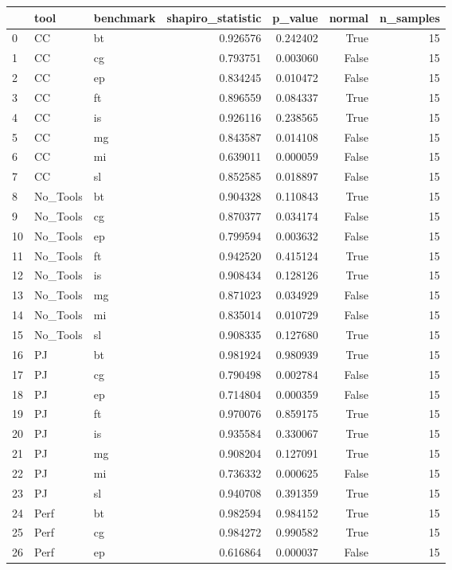 \begin{tabular}{lllrrrr}
\toprule
 & tool & benchmark & shapiro_statistic & p_value & normal & n_samples \\
\midrule
0 & CC & bt & 0.926576 & 0.242402 & True & 15 \\
1 & CC & cg & 0.793751 & 0.003060 & False & 15 \\
2 & CC & ep & 0.834245 & 0.010472 & False & 15 \\
3 & CC & ft & 0.896559 & 0.084337 & True & 15 \\
4 & CC & is & 0.926116 & 0.238565 & True & 15 \\
5 & CC & mg & 0.843587 & 0.014108 & False & 15 \\
6 & CC & mi & 0.639011 & 0.000059 & False & 15 \\
7 & CC & sl & 0.852585 & 0.018897 & False & 15 \\
8 & No_Tools & bt & 0.904328 & 0.110843 & True & 15 \\
9 & No_Tools & cg & 0.870377 & 0.034174 & False & 15 \\
10 & No_Tools & ep & 0.799594 & 0.003632 & False & 15 \\
11 & No_Tools & ft & 0.942520 & 0.415124 & True & 15 \\
12 & No_Tools & is & 0.908434 & 0.128126 & True & 15 \\
13 & No_Tools & mg & 0.871023 & 0.034929 & False & 15 \\
14 & No_Tools & mi & 0.835014 & 0.010729 & False & 15 \\
15 & No_Tools & sl & 0.908335 & 0.127680 & True & 15 \\
16 & PJ & bt & 0.981924 & 0.980939 & True & 15 \\
17 & PJ & cg & 0.790498 & 0.002784 & False & 15 \\
18 & PJ & ep & 0.714804 & 0.000359 & False & 15 \\
19 & PJ & ft & 0.970076 & 0.859175 & True & 15 \\
20 & PJ & is & 0.935584 & 0.330067 & True & 15 \\
21 & PJ & mg & 0.908204 & 0.127091 & True & 15 \\
22 & PJ & mi & 0.736332 & 0.000625 & False & 15 \\
23 & PJ & sl & 0.940708 & 0.391359 & True & 15 \\
24 & Perf & bt & 0.982594 & 0.984152 & True & 15 \\
25 & Perf & cg & 0.984272 & 0.990582 & True & 15 \\
26 & Perf & ep & 0.616864 & 0.000037 & False & 15 \\

\end{tabular}
